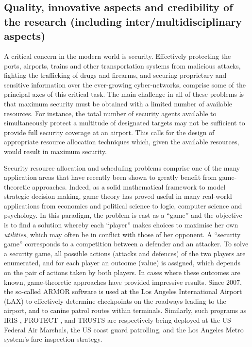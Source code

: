 
\subsection{Quality, innovative aspects and credibility of the research (including inter/multidisciplinary aspects)}
\label{sec:quality}

A critical concern in the modern world is security. Effectively protecting the ports, airports, trains and other transportation systems from malicious attacks, fighting the trafficking of drugs and firearms, and securing proprietary and sensitive information over the ever-growing cyber-networks, comprise some of the principal axes of this critical task. The main challenge in all of these problems is that maximum security must be obtained with a limited number of available resources. For instance, the total number of security agents available to simultaneously protect a multitude of designated targets may not be sufficient to provide full security coverage at an airport. This calls for the design of appropriate resource allocation techniques which, given the available resources, would result in maximum security. %
 
Security resource allocation and scheduling problems comprise one of the many application areas that have recently been shown to greatly benefit from game-theoretic approaches. Indeed, as a solid mathematical framework to model strategic decision making, game theory has proved useful in many real-world applications from economics and political science to logic, computer science and psychology. In this paradigm, the problem is cast as a ``game'' and the objective is to find a solution whereby each ``player'' makes choices to maximise her own \textit{utilities}, which may often be in conflict with those of her opponent. A ``security game'' corresponds to a competition between a defender and an attacker. To solve a security game, all possible actions (attacks and defences) of the two players are enumerated, and for each player an outcome (value) is assigned, which depends on the pair of actions taken by both players. In cases where these outcomes are known, game-theoretic approaches have provided impressive results. Since 2007, the so-called ARMOR software \cite{pita2008deployed} is used at the Los Angeles International Airport (LAX) to effectively determine checkpoints on the roadways leading to the airport, and to canine patrol routes within terminals. Similarly, such programs as IRIS \cite{tsai2009iris}, PROTECT \cite{shieh2012protect}, and TRUSTS \cite{yin2012trusts} are respectively being deployed at the US Federal Air Marshals, the US coast guard patrolling, and the Los Angeles Metro system's fare inspection strategy. 

